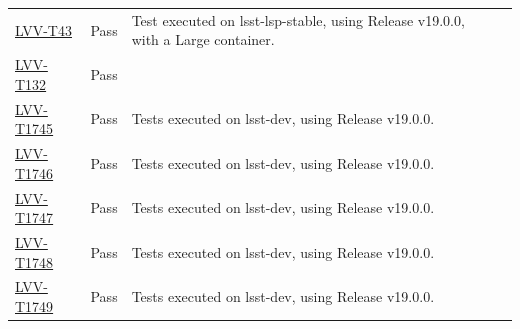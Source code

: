 \documentclass[DM,lsstdraft,STR,toc]{lsstdoc}
\begin{document}
\begin{longtable}{p{2cm}p{2.5cm}p{9cm}p{2.5cm}}
\begin{minipage}[]{9cm}
    \medskip
    \end{minipage}
    &
    \\\hline
\href{https://jira.lsstcorp.org/secure/Tests.jspa#/testCase/LVV-T43}{LVV-T43}
    & Pass &
    \begin{minipage}[]{9cm}
    \smallskip
     Test executed on lsst-lsp-stable, using Release v19.0.0, with a Large
container.

    \medskip
    \end{minipage}
    &
    \\\hline
\href{https://jira.lsstcorp.org/secure/Tests.jspa#/testCase/LVV-T132}{LVV-T132}
    & Pass &
    \begin{minipage}[]{9cm}
    \smallskip
    
    \medskip
    \end{minipage}
    &
    \\\hline
\href{https://jira.lsstcorp.org/secure/Tests.jspa#/testCase/LVV-T1745}{LVV-T1745}
    & Pass &
    \begin{minipage}[]{9cm}
    \smallskip
     Tests executed on lsst-dev, using Release v19.0.0.

    \medskip
    \end{minipage}
    &
    \\\hline
\href{https://jira.lsstcorp.org/secure/Tests.jspa#/testCase/LVV-T1746}{LVV-T1746}
    & Pass &
    \begin{minipage}[]{9cm}
    \smallskip
     Tests executed on lsst-dev, using Release v19.0.0.

    \medskip
    \end{minipage}
    &
    \\\hline
\href{https://jira.lsstcorp.org/secure/Tests.jspa#/testCase/LVV-T1747}{LVV-T1747}
    & Pass &
    \begin{minipage}[]{9cm}
    \smallskip
     Tests executed on lsst-dev, using Release v19.0.0.

    \medskip
    \end{minipage}
    &
    \\\hline
\href{https://jira.lsstcorp.org/secure/Tests.jspa#/testCase/LVV-T1748}{LVV-T1748}
    & Pass &
    \begin{minipage}[]{9cm}
    \smallskip
     Tests executed on lsst-dev, using Release v19.0.0.

    \medskip
    \end{minipage}
    &
    \\\hline
\href{https://jira.lsstcorp.org/secure/Tests.jspa#/testCase/LVV-T1749}{LVV-T1749}
    & Pass &
    \begin{minipage}[]{9cm}
    \smallskip
     Tests executed on lsst-dev, using Release v19.0.0.


\end{minipage}
\end{longtable}
\end{document}
